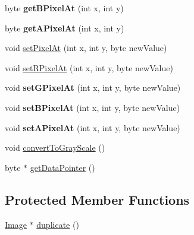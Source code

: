 \begin{DoxyCompactItemize}
\item 
\hypertarget{classCartWheel_1_1Util_1_1Image_a769bf50af04df71e2c5ee7bbf7e98ec5}{
byte {\bfseries getBPixelAt} (int x, int y)}
\label{classCartWheel_1_1Util_1_1Image_a769bf50af04df71e2c5ee7bbf7e98ec5}

\item 
\hypertarget{classCartWheel_1_1Util_1_1Image_a39dd26a33eda74f6acf2adc6d4da116d}{
byte {\bfseries getAPixelAt} (int x, int y)}
\label{classCartWheel_1_1Util_1_1Image_a39dd26a33eda74f6acf2adc6d4da116d}

\item 
void \hyperlink{classCartWheel_1_1Util_1_1Image_a28ecf729560e39b56c1dd44b3d152b79}{setPixelAt} (int x, int y, byte newValue)
\item 
void \hyperlink{classCartWheel_1_1Util_1_1Image_a0fac12ef4b19700890c191bec1c29a03}{setRPixelAt} (int x, int y, byte newValue)
\item 
\hypertarget{classCartWheel_1_1Util_1_1Image_ac18e63e77d305c0c3806cb32170b06b5}{
void {\bfseries setGPixelAt} (int x, int y, byte newValue)}
\label{classCartWheel_1_1Util_1_1Image_ac18e63e77d305c0c3806cb32170b06b5}

\item 
\hypertarget{classCartWheel_1_1Util_1_1Image_a04688c86023367986e94dd6b4f1a5867}{
void {\bfseries setBPixelAt} (int x, int y, byte newValue)}
\label{classCartWheel_1_1Util_1_1Image_a04688c86023367986e94dd6b4f1a5867}

\item 
\hypertarget{classCartWheel_1_1Util_1_1Image_a8a0b01ddb09849c5352951de59446dd5}{
void {\bfseries setAPixelAt} (int x, int y, byte newValue)}
\label{classCartWheel_1_1Util_1_1Image_a8a0b01ddb09849c5352951de59446dd5}

\item 
void \hyperlink{classCartWheel_1_1Util_1_1Image_af17078f59a3a9f221ea0335d175a75c2}{convertToGrayScale} ()
\item 
byte $\ast$ \hyperlink{classCartWheel_1_1Util_1_1Image_ac2269012d7dcf1b21cc8bbd1da7e6e13}{getDataPointer} ()
\end{DoxyCompactItemize}
\subsection*{Protected Member Functions}
\begin{DoxyCompactItemize}
\item 
\hyperlink{classCartWheel_1_1Util_1_1Image}{Image} $\ast$ \hyperlink{classCartWheel_1_1Util_1_1Image_a2e419982137bb49813bd644c726bbcaf}{duplicate} ()
\end{DoxyCompactItemize}
